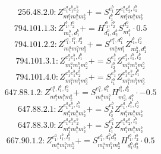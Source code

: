 \documentclass[letterpaper,10pt,fleqn,leqno,onecolumn]{article}
\begin{document}
\begin{equation} \;\;\;\;\;\;  256.48.2.0: Z^{e_{1}^{a}e_{1}^{b}e_{2}^{b}}_{m_{1}^{a}m_{1}^{b}m_{2}^{b}}+=S^{e_{1}^{b}}_{l_{1}^{b}}Z^{e_{1}^{a}e_{2}^{b},l_{1}^{b}}_{m_{1}^{a}m_{1}^{b}m_{2}^{b}} \end{equation}
\begin{equation} \;\;\;\;\;\;  794.101.1.3: Z^{l_{1}^{b},l_{2}^{b}}_{m_{1}^{b},d_{1}^{b}}+=H^{l_{1}^{b},l_{2}^{b}}_{d_{1}^{b},d_{2}^{b}}S^{d_{2}^{b}}_{m_{1}^{b}}\cdot 0.5 \end{equation}
\begin{equation} \;\;\;\;\;\;  794.101.2.2: Z^{e_{1}^{a},l_{1}^{b},l_{2}^{b}}_{m_{1}^{a}m_{1}^{b}m_{2}^{b}}+=S^{e_{1}^{a},d_{1}^{b}}_{m_{1}^{a}m_{1}^{b}}Z^{l_{1}^{b},l_{2}^{b}}_{m_{2}^{b},d_{1}^{b}} \end{equation}
\begin{equation} \;\;\;\;\;\;  794.101.3.1: Z^{e_{1}^{a}e_{1}^{b},l_{1}^{b}}_{m_{1}^{a}m_{1}^{b}m_{2}^{b}}+=S^{e_{1}^{b}}_{l_{2}^{b}}Z^{e_{1}^{a},l_{1}^{b},l_{2}^{b}}_{m_{1}^{a}m_{1}^{b}m_{2}^{b}} \end{equation}
\begin{equation} \;\;\;\;\;\;  794.101.4.0: Z^{e_{1}^{a}e_{1}^{b}e_{2}^{b}}_{m_{1}^{a}m_{1}^{b}m_{2}^{b}}+=S^{e_{1}^{b}}_{l_{1}^{b}}Z^{e_{1}^{a}e_{2}^{b},l_{1}^{b}}_{m_{1}^{a}m_{1}^{b}m_{2}^{b}} \end{equation}
\begin{equation} \;\;\;\;\;\;  647.88.1.2: Z^{e_{1}^{a},l_{1}^{b},l_{2}^{b}}_{m_{1}^{a}m_{1}^{b}m_{2}^{b}}+=S^{e_{1}^{a},d_{1}^{b}}_{m_{1}^{a}m_{1}^{b}}H^{l_{1}^{b},l_{2}^{b}}_{m_{2}^{b},d_{1}^{b}}\cdot -0.5 \end{equation}
\begin{equation} \;\;\;\;\;\;  647.88.2.1: Z^{e_{1}^{a}e_{1}^{b},l_{1}^{b}}_{m_{1}^{a}m_{1}^{b}m_{2}^{b}}+=S^{e_{1}^{b}}_{l_{2}^{b}}Z^{e_{1}^{a},l_{1}^{b},l_{2}^{b}}_{m_{1}^{a}m_{1}^{b}m_{2}^{b}} \end{equation}
\begin{equation} \;\;\;\;\;\;  647.88.3.0: Z^{e_{1}^{a}e_{1}^{b}e_{2}^{b}}_{m_{1}^{a}m_{1}^{b}m_{2}^{b}}+=S^{e_{1}^{b}}_{l_{1}^{b}}Z^{e_{1}^{a}e_{2}^{b},l_{1}^{b}}_{m_{1}^{a}m_{1}^{b}m_{2}^{b}} \end{equation}
\begin{equation} \;\;\;\;\;\;  667.90.1.2: Z^{e_{1}^{a},l_{1}^{b},l_{2}^{b}}_{m_{1}^{a}m_{1}^{b}m_{2}^{b}}+=S^{e_{1}^{a},d_{1}^{b}d_{2}^{b}}_{m_{1}^{a}m_{1}^{b}m_{2}^{b}}H^{l_{1}^{b},l_{2}^{b}}_{d_{1}^{b}d_{2}^{b}}\cdot 0.5 \end{equation}
\end{document}
